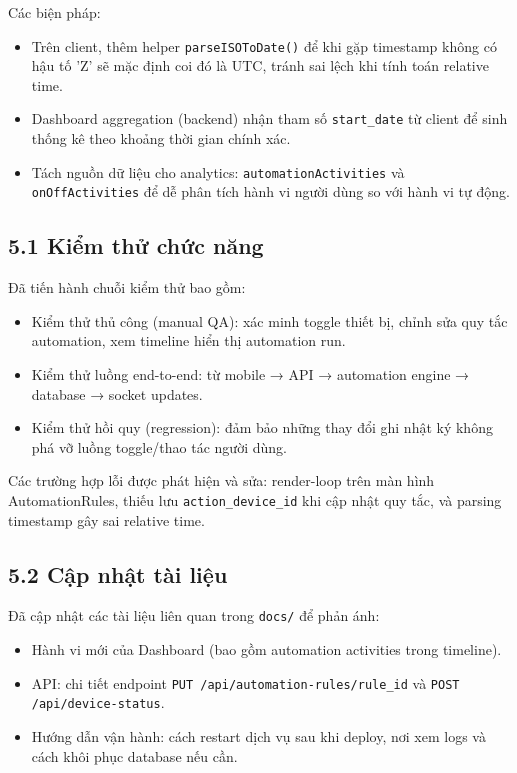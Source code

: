 \documentclass[12pt]{article}
\begin{document}
Các biện pháp:
\begin{itemize}[noitemsep]
  \item Trên client, thêm helper \texttt{parseISOToDate()} để khi gặp timestamp không có hậu tố 'Z' sẽ mặc định coi đó là UTC, tránh sai lệch khi tính toán relative time.
  \item Dashboard aggregation (backend) nhận tham số \texttt{start\_date} từ client để sinh thống kê theo khoảng thời gian chính xác.
  \item Tách nguồn dữ liệu cho analytics: \texttt{automationActivities} và \texttt{onOffActivities} để dễ phân tích hành vi người dùng so với hành vi tự động.
\end{itemize}

\setcounter{section}{5}
\setcounter{subsection}{0}

\subsection{5.1 Kiểm thử chức năng}
Đã tiến hành chuỗi kiểm thử bao gồm:
\begin{itemize}[noitemsep]
  \item Kiểm thử thủ công (manual QA): xác minh toggle thiết bị, chỉnh sửa quy tắc automation, xem timeline hiển thị automation run.
  \item Kiểm thử luồng end-to-end: từ mobile → API → automation engine → database → socket updates.
  \item Kiểm thử hồi quy (regression): đảm bảo những thay đổi ghi nhật ký không phá vỡ luồng toggle/thao tác người dùng.
\end{itemize}

Các trường hợp lỗi được phát hiện và sửa: render-loop trên màn hình AutomationRules, thiếu lưu \texttt{action\_device\_id} khi cập nhật quy tắc, và parsing timestamp gây sai relative time.

\subsection{5.2 Cập nhật tài liệu}
Đã cập nhật các tài liệu liên quan trong \texttt{docs/} để phản ánh:
\begin{itemize}[noitemsep]
  \item Hành vi mới của Dashboard (bao gồm automation activities trong timeline).
  \item API: chi tiết endpoint \texttt{PUT /api/automation-rules/{rule\_id}} và \texttt{POST /api/device-status}.
  \item Hướng dẫn vận hành: cách restart dịch vụ sau khi deploy, nơi xem logs và cách khôi phục database nếu cần.
\end{itemize}
\end{document}
